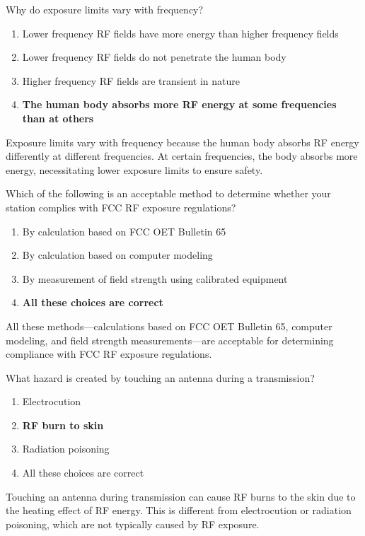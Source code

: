 \begin{tcolorbox}[colback=gray!10!white,colframe=black!75!black,title={T0C05}]
Why do exposure limits vary with frequency?
\begin{enumerate}[label=\Alph*),noitemsep]
    \item Lower frequency RF fields have more energy than higher frequency fields
    \item Lower frequency RF fields do not penetrate the human body
    \item Higher frequency RF fields are transient in nature
    \item \textbf{The human body absorbs more RF energy at some frequencies than at others}
\end{enumerate}
\end{tcolorbox}
Exposure limits vary with frequency because the human body absorbs RF energy differently at different frequencies. At certain frequencies, the body absorbs more energy, necessitating lower exposure limits to ensure safety.

\begin{tcolorbox}[colback=gray!10!white,colframe=black!75!black,title={T0C06}]
Which of the following is an acceptable method to determine whether your station complies with FCC RF exposure regulations?
\begin{enumerate}[label=\Alph*),noitemsep]
    \item By calculation based on FCC OET Bulletin 65
    \item By calculation based on computer modeling
    \item By measurement of field strength using calibrated equipment
    \item \textbf{All these choices are correct}
\end{enumerate}
\end{tcolorbox}
All these methods—calculations based on FCC OET Bulletin 65, computer modeling, and field strength measurements—are acceptable for determining compliance with FCC RF exposure regulations.

\begin{tcolorbox}[colback=gray!10!white,colframe=black!75!black,title={T0C07}]
What hazard is created by touching an antenna during a transmission?
\begin{enumerate}[label=\Alph*),noitemsep]
    \item Electrocution
    \item \textbf{RF burn to skin}
    \item Radiation poisoning
    \item All these choices are correct
\end{enumerate}
\end{tcolorbox}
Touching an antenna during transmission can cause RF burns to the skin due to the heating effect of RF energy. This is different from electrocution or radiation poisoning, which are not typically caused by RF exposure.

